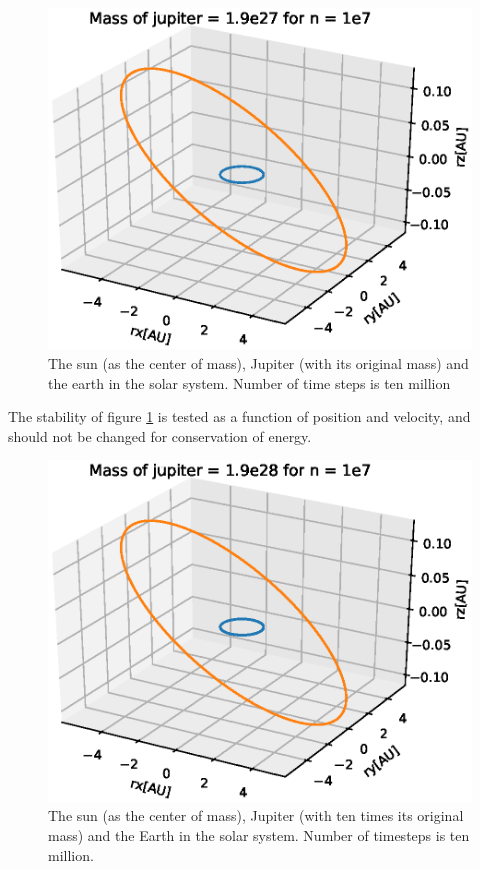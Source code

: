 \documentclass{article}
\begin{document}
\begin{figure}[H]
  \includegraphics[scale=0.5]{plots/Mass1.eps}
  \caption{The sun (as the center of mass), Jupiter (with its original mass) and the earth in the solar system. Number of time steps is ten million}
  \label{jupitermass1}
\end{figure}

The stability of figure \ref{jupitermass1} is tested as a function of position and velocity, and should not be changed for conservation of energy.



\begin{figure}[H]
  \includegraphics[scale=0.5]{plots/Mass10.eps}
  \caption{The sun (as the center of mass), Jupiter (with ten times its original mass) and the Earth in the solar system. Number of timesteps is ten million.}
  \label{jupitermass10}
\end{figure}
\end{document}
